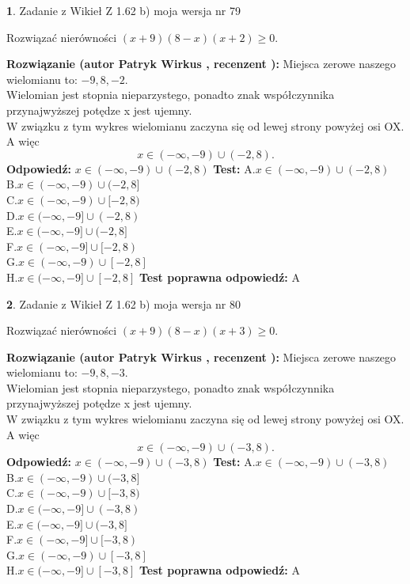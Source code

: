 \documentclass[12pt, a4paper]{article}
\theoremstyle{definition} %
\newtheorem{zad}{}
\newcommand{\zadStart}[1]{\begin{zad}#1\newline}
\newcommand{\zadStop}{\end{zad}}
\newcommand{\rozwStart}[2]{\noindent \textbf{Rozwiązanie (autor #1 , recenzent #2): }\newline}
\newcommand{\rozwStop}{\newline}
\newcommand{\odpStart}{\noindent \textbf{Odpowiedź:}\newline}
\newcommand{\odpStop}{\newline}
\newcommand{\testStart}{\noindent \textbf{Test:}\newline}
\newcommand{\testStop}{\newline}
\newcommand{\kluczStart}{\noindent \textbf{Test poprawna odpowiedź:}\newline}
\newcommand{\kluczStop}{\newline}
\begin{document}
\zadStart{Zadanie z Wikieł Z 1.62 b) moja wersja nr 79}

Rozwiązać nierówności $(x+9)(8-x)(x+2)\ge0$.
\zadStop
\rozwStart{Patryk Wirkus}{}
Miejsca zerowe naszego wielomianu to: $-9, 8, -2$.\\
Wielomian jest stopnia nieparzystego, ponadto znak współczynnika przy\linebreak najwyższej potędze x jest ujemny.\\ W związku z tym wykres wielomianu zaczyna się od lewej strony powyżej osi OX. A więc $$x \in (-\infty,-9) \cup (-2,8).$$
\rozwStop
\odpStart
$x \in (-\infty,-9) \cup (-2,8)$
\odpStop
\testStart
A.$x \in (-\infty,-9) \cup (-2,8)$\\
B.$x \in (-\infty,-9) \cup (-2,8]$\\
C.$x \in (-\infty,-9) \cup [-2,8)$\\
D.$x \in (-\infty,-9] \cup (-2,8)$\\
E.$x \in (-\infty,-9] \cup (-2,8]$\\
F.$x \in (-\infty,-9] \cup [-2,8)$\\
G.$x \in (-\infty,-9) \cup [-2,8]$\\
H.$x \in (-\infty,-9] \cup [-2,8]$
\testStop
\kluczStart
A
\kluczStop



\zadStart{Zadanie z Wikieł Z 1.62 b) moja wersja nr 80}

Rozwiązać nierówności $(x+9)(8-x)(x+3)\ge0$.
\zadStop
\rozwStart{Patryk Wirkus}{}
Miejsca zerowe naszego wielomianu to: $-9, 8, -3$.\\
Wielomian jest stopnia nieparzystego, ponadto znak współczynnika przy\linebreak najwyższej potędze x jest ujemny.\\ W związku z tym wykres wielomianu zaczyna się od lewej strony powyżej osi OX. A więc $$x \in (-\infty,-9) \cup (-3,8).$$
\rozwStop
\odpStart
$x \in (-\infty,-9) \cup (-3,8)$
\odpStop
\testStart
A.$x \in (-\infty,-9) \cup (-3,8)$\\
B.$x \in (-\infty,-9) \cup (-3,8]$\\
C.$x \in (-\infty,-9) \cup [-3,8)$\\
D.$x \in (-\infty,-9] \cup (-3,8)$\\
E.$x \in (-\infty,-9] \cup (-3,8]$\\
F.$x \in (-\infty,-9] \cup [-3,8)$\\
G.$x \in (-\infty,-9) \cup [-3,8]$\\
H.$x \in (-\infty,-9] \cup [-3,8]$
\testStop
\kluczStart
A
\kluczStop
\end{document}
